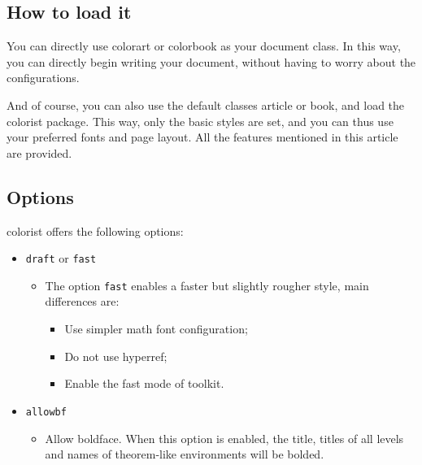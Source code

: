 \documentclass[allowbf]{colorart}
\providecommand{\colorist}{{\normalfont\textsf{colorist}}}
\providecommand{\colorart}{{\normalfont\textsf{colorart}}}
\providecommand{\colorbook}{{\normalfont\textsf{colorbook}}}
\begin{document}
\subsection{How to load it}
You can directly use \colorart{} or \colorbook{} as your document class. In this way, you can directly begin writing your document, without having to worry about the configurations.


And of course, you can also use the default classes \textsf{article} or \textsf{book}, and load the \colorist{} package. This way, only the basic styles are set, and you can thus use your preferred fonts and page layout. All the features mentioned in this article are provided.
\begin{code}
  \usepackage{colorist}
\end{code}

\subsection{Options}

\colorist{} offers the following options: 

\begin{itemize}
    \item \texttt{draft} or \texttt{fast}
        \begin{itemize}
            \item The option \verb|fast| enables a faster but slightly rougher style, main differences are:
            \begin{itemize}
                \item Use simpler math font configuration; 
                \item Do not use hyperref; 
                \item Enable the fast mode of \ProjLib{} toolkit.
            \end{itemize}
        \end{itemize}
    \item \texttt{allowbf}
        \begin{itemize}
            \item Allow boldface. When this option is enabled, the title, titles of all levels and names of theorem-like environments will be bolded.
        \end{itemize}
\end{itemize}
\end{document}
